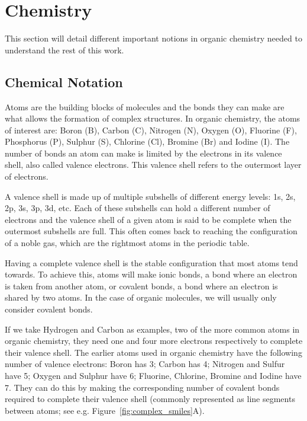 \documentclass[../Document.tex]{subfiles}
\begin{document}
\section{Chemistry}
\label{sec:intro/chemistry}
This section will detail different important notions in organic chemistry needed to understand the rest of this work.


\subsection{Chemical Notation}
Atoms are the building blocks of molecules and the bonds they can make are what allows the formation of complex structures. In organic chemistry, the atoms of interest are: Boron (B), Carbon (C), Nitrogen (N), Oxygen (O), Fluorine (F), Phosphorus (P), Sulphur (S), Chlorine (Cl), Bromine (Br) and Iodine (I).
The number of bonds an atom can make is limited by the electrons in its valence shell, also called valence electrons. This valence shell refers to the outermost layer of electrons.

A valence shell is made up of multiple subshells of different energy levels: 1s, 2s, 2p, 3s, 3p, 3d, etc. Each of these subshells can hold a different number of electrons and the valence shell of a given atom is said to be complete when the outermost subshells are full. This often comes back to reaching the configuration of a noble gas, which are the rightmost atoms in the periodic table.

Having a complete valence shell is the stable configuration that most atoms tend towards. To achieve this, atoms will make ionic bonds, a bond where an electron is taken from another atom, or covalent bonds, a bond where an electron is shared by two atoms. In the case of organic molecules, we will usually only consider covalent bonds.

If we take Hydrogen and Carbon as examples, two of the more common atoms in organic chemistry, they need one and four more electrons respectively to complete their valence shell. The earlier atoms used in organic chemistry have the following number of valence electrons: Boron has 3; Carbon has 4; Nitrogen and Sulfur have 5; Oxygen and Sulphur have 6; Fluorine, Chlorine, Bromine and Iodine have 7.
They can do this by making the corresponding number of covalent bonds required to complete their valence shell (commonly represented as line segments between atoms; see e.g. Figure~\ref{fig:complex_smiles}A).
\end{document}
